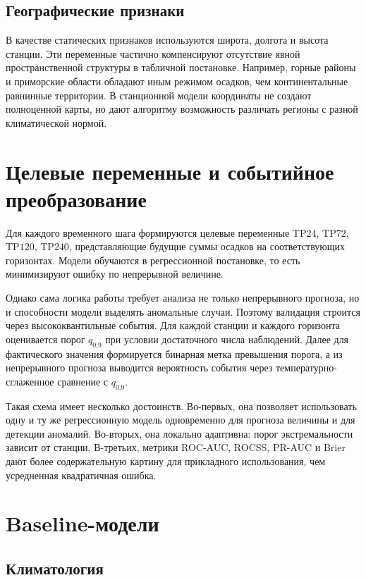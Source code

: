 \subsection{Географические признаки}

В качестве статических признаков используются широта, долгота и высота станции. Эти переменные частично компенсируют отсутствие явной пространственной структуры в табличной постановке. Например, горные районы и приморские области обладают иным режимом осадков, чем континентальные равнинные территории. В станционной модели координаты не создают полноценной карты, но дают алгоритму возможность различать регионы с разной климатической нормой.

\section{Целевые переменные и событийное преобразование}

Для каждого временного шага формируются целевые переменные \(\mathrm{TP24}\), \(\mathrm{TP72}\), \(\mathrm{TP120}\), \(\mathrm{TP240}\), представляющие будущие суммы осадков на соответствующих горизонтах. Модели обучаются в регрессионной постановке, то есть минимизируют ошибку по непрерывной величине.

Однако сама логика работы требует анализа не только непрерывного прогноза, но и способности модели выделять аномальные случаи. Поэтому валидация строится через высококвантильные события. Для каждой станции и каждого горизонта оценивается порог \(q_{0.9}\) при условии достаточного числа наблюдений. Далее для фактического значения формируется бинарная метка превышения порога, а из непрерывного прогноза выводится вероятность события через температурно-сглаженное сравнение с \(q_{0.9}\).

Такая схема имеет несколько достоинств. Во-первых, она позволяет использовать одну и ту же регрессионную модель одновременно для прогноза величины и для детекции аномалий. Во-вторых, она локально адаптивна: порог экстремальности зависит от станции. В-третьих, метрики ROC-AUC, ROCSS, PR-AUC и Brier дают более содержательную картину для прикладного использования, чем усредненная квадратичная ошибка.

\section{Baseline-модели}

\subsection{Климатология}

